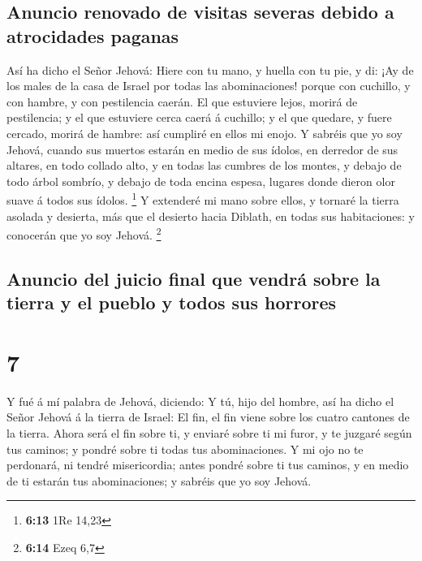 \hypertarget{anuncio-renovado-de-visitas-severas-debido-a-atrocidades-paganas}{%
\subsection{Anuncio renovado de visitas severas debido a atrocidades
paganas}\label{anuncio-renovado-de-visitas-severas-debido-a-atrocidades-paganas}}

 Así ha dicho el Señor Jehová: Hiere con tu mano, y huella
con tu pie, y di: ¡Ay de los males de la casa de Israel por todas las
abominaciones! porque con cuchillo, y con hambre, y con pestilencia
caerán.  El que estuviere lejos, morirá de pestilencia; y
el que estuviere cerca caerá á cuchillo; y el que quedare, y fuere
cercado, morirá de hambre: así cumpliré en ellos mi enojo. 
Y sabréis que yo soy Jehová, cuando sus muertos estarán en medio de sus
ídolos, en derredor de sus altares, en todo collado alto, y en todas las
cumbres de los montes, y debajo de todo árbol sombrío, y debajo de toda
encina espesa, lugares donde dieron olor suave á todos sus ídolos.
\footnote{\textbf{6:13} 1Re 14,23}  Y extenderé mi mano
sobre ellos, y tornaré la tierra asolada y desierta, más que el desierto
hacia Diblath, en todas sus habitaciones: y conocerán que yo soy Jehová.
\footnote{\textbf{6:14} Ezeq 6,7}

\hypertarget{anuncio-del-juicio-final-que-vendruxe1-sobre-la-tierra-y-el-pueblo-y-todos-sus-horrores}{%
\subsection{Anuncio del juicio final que vendrá sobre la tierra y el
pueblo y todos sus
horrores}\label{anuncio-del-juicio-final-que-vendruxe1-sobre-la-tierra-y-el-pueblo-y-todos-sus-horrores}}

\hypertarget{section-6}{%
\section{7}\label{section-6}}

 Y fué á mí palabra de Jehová, diciendo:  Y tú,
hijo del hombre, así ha dicho el Señor Jehová á la tierra de Israel: El
fin, el fin viene sobre los cuatro cantones de la tierra. 
Ahora será el fin sobre ti, y enviaré sobre ti mi furor, y te juzgaré
según tus caminos; y pondré sobre ti todas tus abominaciones.
 Y mi ojo no te perdonará, ni tendré misericordia; antes
pondré sobre ti tus caminos, y en medio de ti estarán tus abominaciones;
y sabréis que yo soy Jehová.

